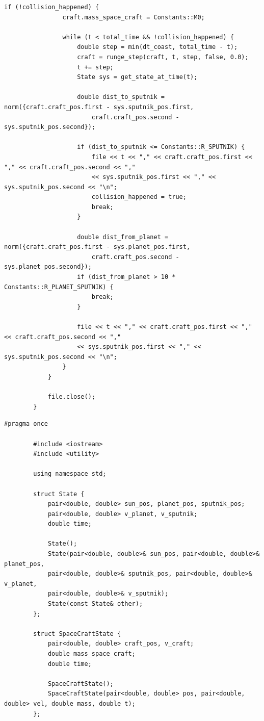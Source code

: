 \documentclass[14pt,a4paper]{extarticle}
\theoremstyle{plain}
\begin{document}
\begin{lstlisting}[title=spacecraftSolver.cpp, gobble=16, breaklines=true, breakatwhitespace=true]
			if (!collision_happened) {
				craft.mass_space_craft = Constants::M0;
				
				while (t < total_time && !collision_happened) {
					double step = min(dt_coast, total_time - t);
					craft = runge_step(craft, t, step, false, 0.0);
					t += step;
					State sys = get_state_at_time(t);
					
					double dist_to_sputnik = norm({craft.craft_pos.first - sys.sputnik_pos.first,
						craft.craft_pos.second - sys.sputnik_pos.second});
					
					if (dist_to_sputnik <= Constants::R_SPUTNIK) {
						file << t << "," << craft.craft_pos.first << "," << craft.craft_pos.second << ","
						<< sys.sputnik_pos.first << "," << sys.sputnik_pos.second << "\n";
						collision_happened = true;
						break;
					}
					
					double dist_from_planet = norm({craft.craft_pos.first - sys.planet_pos.first,
						craft.craft_pos.second - sys.planet_pos.second});
					if (dist_from_planet > 10 * Constants::R_PLANET_SPUTNIK) {
						break;
					}
					
					file << t << "," << craft.craft_pos.first << "," << craft.craft_pos.second << ","
					<< sys.sputnik_pos.first << "," << sys.sputnik_pos.second << "\n";
				}
			}
			
			file.close();
		}
	\end{lstlisting}
	
	\begin{lstlisting}[title=state.h, gobble=16, breaklines=true, breakatwhitespace=true]
		#pragma once
		
		#include <iostream>
		#include <utility>
		
		using namespace std;
		
		struct State {
			pair<double, double> sun_pos, planet_pos, sputnik_pos;
			pair<double, double> v_planet, v_sputnik;
			double time;
			
			State();
			State(pair<double, double>& sun_pos, pair<double, double>& planet_pos,
			pair<double, double>& sputnik_pos, pair<double, double>& v_planet,
			pair<double, double>& v_sputnik);
			State(const State& other);
		};
		
		struct SpaceCraftState {
			pair<double, double> craft_pos, v_craft;
			double mass_space_craft;
			double time;
			
			SpaceCraftState();
			SpaceCraftState(pair<double, double> pos, pair<double, double> vel, double mass, double t);
		};
	\end{lstlisting}
	
\end{document}

